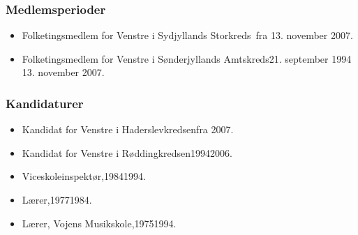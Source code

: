 \documentclass[11pt, a4paper]{awesome-cv}
\begin{document}
\begin{cvletter}
\subsubsection*{Medlemsperioder}
\begin{itemize}
\item Folketingsmedlem for Venstre i Sydjyllands Storkreds fra 13. november 2007.
\item Folketingsmedlem for Venstre i Sønderjyllands Amtskreds21. september 1994  13. november 2007.
\end{itemize}
\subsubsection*{Kandidaturer}
\begin{itemize}
\item Kandidat for Venstre i Haderslevkredsenfra 2007.
\item Kandidat for Venstre i Røddingkredsen19942006.
\end{itemize}
\begin{itemize}
\item Viceskoleinspektør,19841994.
\item Lærer,19771984.
\item Lærer, Vojens Musikskole,19751994.
\end{itemize}
\end{cvletter}
\end{document}
